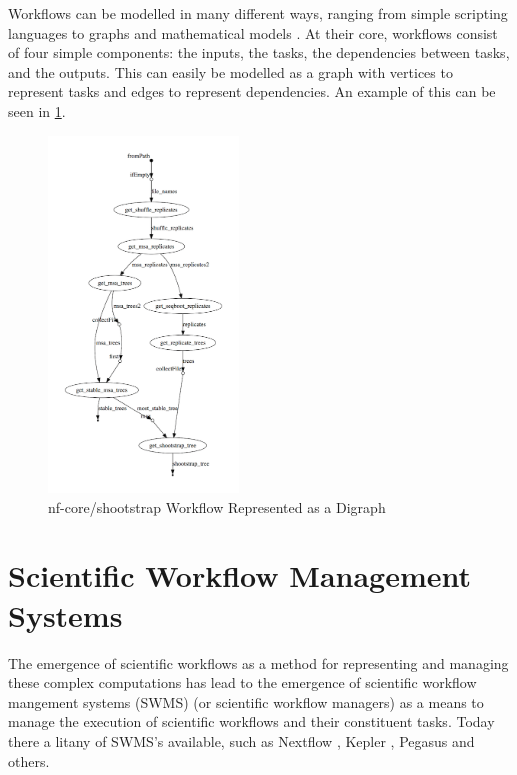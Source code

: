 Workflows can be modelled in many different ways, ranging from simple scripting languages to graphs and mathematical models \cite{Shields}. At their core, workflows consist of four simple components: the inputs, the tasks, the dependencies between tasks, and the outputs. This can easily be modelled as a graph with vertices to represent tasks and edges to represent dependencies. An example of this can be seen in \ref{fig:dag}. 

\begin{figure}[hp]
    \centering
        \includegraphics[width=0.45\textwidth,height=0.675\textheight]{fig/dag.png}
        \caption{nf-core/shootstrap Workflow Represented as a Digraph \cite{dag}}
        \label{fig:dag}
\end{figure}




\section{Scientific Workflow Management Systems}
\label{sec:management}

The emergence of scientific workflows as a method for representing and managing these complex computations has lead to the emergence of scientific workflow mangement systems (SWMS) (or scientific workflow managers) as a means to manage the execution of scientific workflows and their constituent tasks. Today there a litany of SWMS’s available, such as Nextflow \cite{nextflow},  Kepler \cite{kepler},  Pegasus \cite{pegasus} and others.

